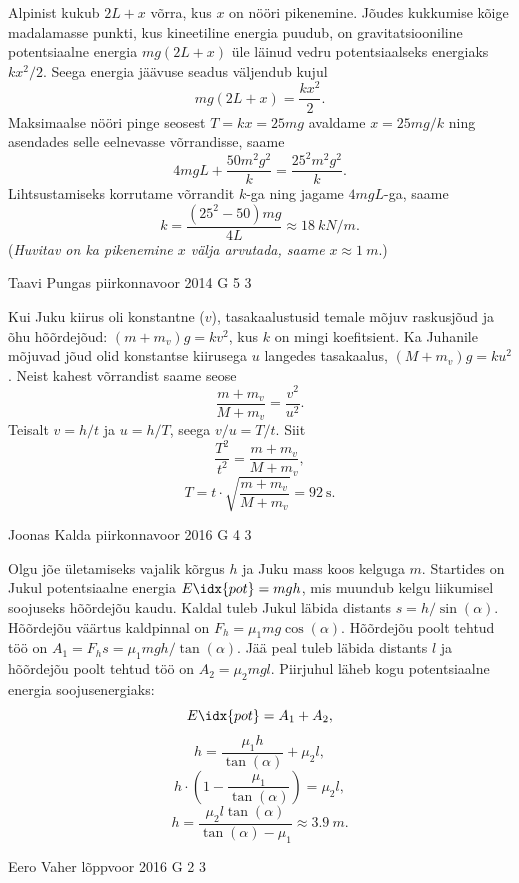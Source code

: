 \documentclass[11pt]{article}
\begin{document}
{{\ifSolution
Alpinist kukub $2L+x$ võrra, kus $x$ on nööri pikenemine. Jõudes kukkumise kõige madalamasse punkti, kus kineetiline energia puudub, on gravitatsiooniline potentsiaalne energia $mg(2L+x)$ üle läinud vedru potentsiaalseks energiaks $kx^2/2$. Seega energia jäävuse seadus väljendub kujul
\[mg(2L+x)=\frac{kx^2}{2}.\]
Maksimaalse nööri pinge seosest $T=kx=25mg$ avaldame $x=25mg/k$ ning asendades selle eelnevasse võrrandisse, saame
\[4mgL+\frac{50m^2g^2}{k}=\frac{25^2m^2g^2}{k}.\]
Lihtsustamiseks korrutame võrrandit $k$-ga ning jagame $4mgL$-ga, saame
\[k=\frac{(25^2-50)mg}{4L}\approx \SI{18}{kN/m}.\]
({\em Huvitav on ka pikenemine $x$ välja arvutada, saame} $x\approx \SI{1}{m}$.)
\fi
}

{Taavi Pungas} %
{piirkonnavoor} %
{2014} %
{G 5} %
{3} %
{

\ifSolution
Kui Juku kiirus oli konstantne ($v$), tasakaalustusid temale mõjuv raskusjõud ja õhu hõõrdejõud: $(m+m_v)g=kv^2$, kus $k$ on mingi koefitsient. Ka Juhanile mõjuvad jõud olid konstantse kiirusega $u$ langedes tasakaalus, $(M+m_v)g=ku^2$. Neist kahest võrrandist saame seose \[\frac{m+m_v}{M+m_v}=\frac{v^2}{u^2}.\] Teisalt $v=h/t$ ja $u=h/T$, seega $v/u=T/t$. Siit
\[\frac{T^2}{t^2}=\frac{m+m_v}{M+m_v},\]
\[T=t \cdot \sqrt{\frac{m+m_v}{M+m_v}}=\SI{92}{\s}.\]
\fi
}

{Joonas Kalda} %
{piirkonnavoor} %
{2016} %
{G 4} %
{3} %
{

\ifSolution
Olgu jõe ületamiseks vajalik kõrgus $h$ ja Juku mass koos kelguga $m$. Startides on Jukul potentsiaalne energia $E\idx{pot} = mgh$, mis muundub kelgu liikumisel soojuseks hõõrdejõu kaudu. Kaldal tuleb Jukul läbida distants $s = h/\sin(\alpha)$. Hõõrdejõu väärtus kaldpinnal on $F_h=\mu_1 mg \cos(\alpha)$. Hõõrdejõu poolt tehtud töö on $A_1 = F_h s = {\mu_1}mgh/\tan(\alpha)$. Jää peal tuleb läbida distants $l$ ja hõõrdejõu poolt tehtud töö on $A_2 = {\mu_2}mgl$. Piirjuhul läheb kogu potentsiaalne energia soojusenergiaks:
$$E\idx{pot} = A_1 + A_2,$$
$$h =\frac{\mu_1 h}{\tan(\alpha)} + {\mu_2} l, $$
$$h \cdot \left(1 - \frac{\mu_1}{\tan(\alpha)}\right) = {\mu_2} l,$$
$$h = \frac{\mu_2 l \tan(\alpha)}{\tan(\alpha) - {\mu_1}} \approx \SI{3.9}{m}.$$
\fi
}

{Eero Vaher} %
{lõppvoor} %
{2016} %
{G 2} %
{3} %
{

}}
\end{document}
